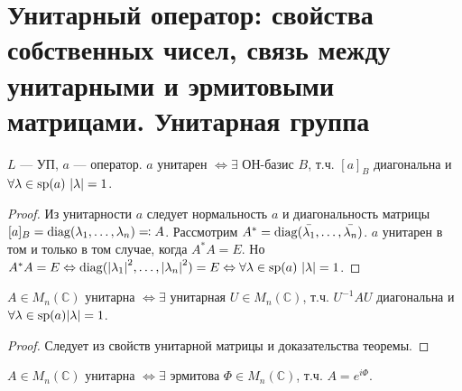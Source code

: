 \section{Унитарный оператор: свойства собственных чисел, связь между унитарными и эрмитовыми матрицами. Унитарная группа}

\begin{thm*}
    $L$ --- УП, $a$ --- оператор. $a$ унитарен $\Leftrightarrow \exists$ ОН-базис $B$, т.ч. $[a]_B$ диагональна и $\forall \lambda \in \spec(a)\ |\lambda| = 1$.
\end{thm*}

\begin{proof}
    Из унитарности $a$ следует нормальность $a$ и диагональность матрицы $[a]_B = \operatorname{diag}(\lambda_1, \dots, \lambda_n) \eqqcolon A$. Рассмотрим $A^* = \operatorname{diag}(\bar{\lambda_1}, \dots, \bar{\lambda_n})$. $a$ унитарен в том и только в том случае, когда $A^*A = E$. Но $A^*A = E \Leftrightarrow \operatorname{diag}({|\lambda_1|}^2, \dots, {|\lambda_n|}^2) = E \Leftrightarrow \forall \lambda \in \operatorname{sp}(a)\ |\lambda| = 1$.
\end{proof}

\begin{cor}
    $A \in M_n(\mathbb{C})$ унитарна $\Leftrightarrow \exists$ унитарная $U \in M_n(\mathbb{C})$, т.ч. $U^{-1} AU$ диагональна и $\forall \lambda \in \operatorname{sp}(a) |\lambda| = 1$.
\end{cor}

\begin{proof}
    Следует из свойств унитарной матрицы и доказательства теоремы.
\end{proof}

\begin{cor}
    $A \in M_n(\mathbb{C})$ унитарна $\Leftrightarrow \exists$ эрмитова $\Phi \in M_n(\mathbb{C})$, т.ч. $A = e^{i\Phi}$.
\end{cor}

